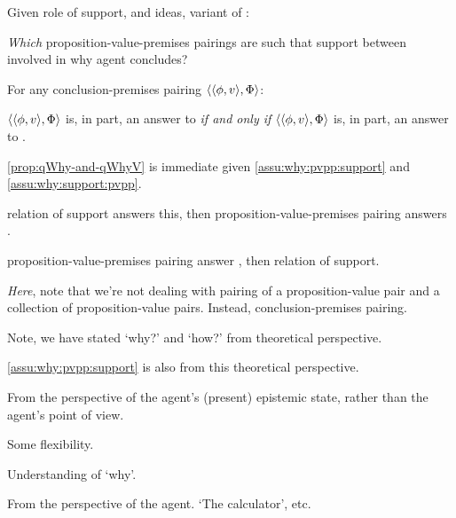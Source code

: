 \begin{note}
  Given role of support, and ideas, variant of \qWhy{}:

  \begin{question}[\qWhyV{}]
    \label{q:why:v}
    \emph{Which} proposition-value-premises pairings are such that support between involved in why agent concludes?
  \end{question}

  \begin{proposition}
    \label{prop:qWhy-and-qWhyV}
    For any conclusion-premises pairing \(\langle \langle \phi, v \rangle, \Phi \rangle\):

    \(\langle \langle \phi, v \rangle, \Phi \rangle\) is, in part, an answer to \qWhyV{} \emph{if and only if} \(\langle \langle \phi, v \rangle, \Phi \rangle\) is, in part, an answer to \qWhy{}.
  \end{proposition}

  \begin{argument}
    \autoref{prop:qWhy-and-qWhyV} is immediate given \autoref{assu:why:pvpp:support} and \autoref{assu:why:support:pvpp}.

    relation of support answers this, then proposition-value-premises pairing answers \qWhy{}.

    proposition-value-premises pairing answer \qWhy{}, then relation of support.
  \end{argument}
\end{note}

\begin{note}
  \emph{Here}, note that we're not dealing with pairing of a proposition-value pair and a collection of proposition-value pairs.
  Instead, conclusion-premises pairing.
\end{note}

\begin{note}
  Note, we have stated `why?' and `how?' from theoretical perspective.

  \autoref{assu:why:pvpp:support} is also from this theoretical perspective.
\end{note}

\begin{note}
  From the perspective of the agent's (present) epistemic state, rather than the agent's point of view.

  Some flexibility.
\end{note}

\begin{note}
  Understanding of `why'.

  From the perspective of the agent.
  `The calculator', etc.
\end{note}

